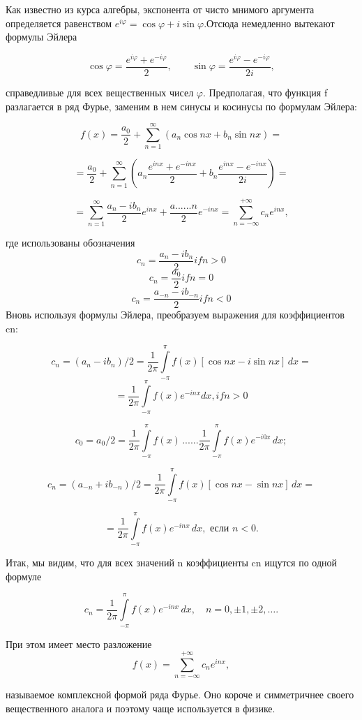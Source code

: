 Как известно из курса алгебры, экспонента от чисто мнимого аргумента определяется равенством $e^{i\varphi }=\cos \varphi +i\sin \varphi $.Отсюда немедленно вытекают формулы Эйлера 

$$
\cos \varphi =\frac{e^{i\varphi }+e^{-i\varphi }}{2},
\qquad
\sin \varphi =\frac{e^{i\varphi }-e^{-i\varphi }}{2i},$$

справедливые для всех вещественных чисел $\varphi $.
Предполагая, что функция f разлагается в ряд Фурье, заменим в нем синусы и косинусы по формулам Эйлера:

$$
f(x)= \frac{a_0}{2}+\sum\limits_{n=1}^\infty (a_n\cos nx
+b_n\sin nx)=$$

$$
= \frac{a_0}{2}+\sum\limits_{n=1}^\infty
\left( a_n \frac {e^{inx }+e^{-inx }}{2}
+b_n\frac{e^{inx }-e^{-inx }}{2i}
\right) =$$

$$
=\sum\limits_{n=1}^\infty\frac{a_n-ib_n}{2}e^{inx }+
\frac{a...
 ...n}{2}e^{-inx }=
\sum\limits_{n=-\infty }^{+\infty }c_ne^{inx },$$

где использованы обозначения
$$c_n = \frac{a_n-ib_n}{2} if n>0$$
$$c_n = \frac{a_0}{2} if n=0$$
$$c_n = \frac{a_{-n}-ib_{-n}}{2} if n<0$$
Вновь используя формулы Эйлера, преобразуем выражения для коэффициентов cn:

$$
c_n=
(a_n-ib_n)/2=
\frac{1}{2\pi }
\int\limits_{-\pi }^{\pi } f(x)[\cos nx -i\sin nx]\, dx=$$
$$=\frac{1}{2\pi }\int\limits_{-\pi }^{\pi }f(x) e^{-inx} dx, if n > 0$$

$$
c_0=a_0/2=
\frac{1}{2\pi }
\int\limits_{-\pi }^{\pi } f(x)\,...
 ...
\frac{1}{2\pi }
\int\limits_{-\pi }^{\pi } f(x) e^{-i0x}\, dx;$$

$$
c_n=
(a_{-n}+ib_{-n})/2=
\frac{1}{2\pi }
\int\limits_{-\pi }^{\pi } f(x)[\cos nx -\sin nx]\, dx=$$

$$
=\frac{1}{2\pi }
\int\limits_{-\pi }^{\pi } f(x) e^{-inx}\, dx,
\mbox{ если $n<0$.}$$

Итак, мы видим, что для всех значений n коэффициенты cn ищутся по одной формуле

$$
c_n=\frac{1}{2\pi }
\int\limits_{-\pi }^{\pi } f(x) e^{-inx}\, dx,
\quad
n=0,\pm 1,\pm 2, \dots .$$

При этом имеет место разложение
$$
f(x)=\sum\limits_{n=-\infty }^{+\infty }c_ne^{inx },$$

называемое комплексной формой ряда Фурье.  Оно короче и симметричнее своего вещественного аналога и поэтому чаще используется в физике.
